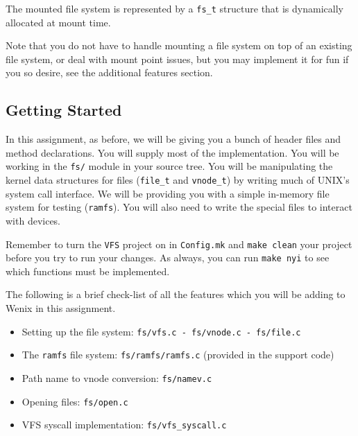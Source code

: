 The mounted file system is represented by a \texttt{fs\_t} structure that is dynamically allocated at mount time.

Note that you do not have to handle mounting a file system on top of an existing file system, or deal with mount point issues, but you may implement it for fun if you so desire, see the additional features section.

\subsection{Getting Started}

\begin{comment} %
The virtual file system (VFS) is an interface providing a clearly defined link between the operating system kernel and the various file systems. The VFS makes it simple to add many different file systems to your kernel and give them a single UNIX-style interface: with a VFS, you can play music by writing to \texttt{/dev/audio}, you can list your processes by reading \texttt{/proc/}, and things you don't want to see to \texttt{/dev/null}. Linux supports lots of different file systems -- e.g. users who don't want to copy all of their Windows files over to a Linux file system can keep them safely on an NTFS partition.
\end{comment}

In this assignment, as before, we will be giving you a bunch of header files and method declarations. You will supply most of the implementation. You will be working in the \texttt{fs/} module in your source tree. You will be manipulating the kernel data structures for files (\texttt{file\_t} and \texttt{vnode\_t}) by writing much of UNIX's system call interface. We will be providing you with a simple in-memory file system for testing (\texttt{ramfs}). You will also need to write the special files to interact with devices.

Remember to turn the \texttt{VFS} project on in \texttt{Config.mk} and \texttt{make clean} your project before you try to run your changes. As always, you can run \texttt{make nyi} to see which functions must be implemented.

The following is a brief check-list of all the features which you will be adding to Wenix in this assignment.

\begin{itemize}
\item Setting up the file system: \texttt{fs/vfs.c - fs/vnode.c - fs/file.c}
\item The \texttt{ramfs} file system: \texttt{fs/ramfs/ramfs.c} (provided in the support code)
\item Path name to vnode conversion: \texttt{fs/namev.c}
\item Opening files: \texttt{fs/open.c}
\item VFS syscall implementation: \texttt{fs/vfs\_syscall.c}
\end{itemize}

